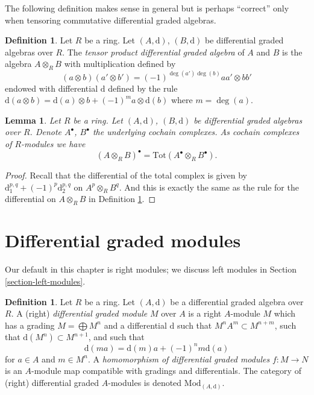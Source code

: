 \documentclass{stacks-project}
\theoremstyle{plain}
\newtheorem{lemma}[subsection]{Lemma}
\theoremstyle{definition}
\newtheorem{definition}[subsection]{Definition}
\theoremstyle{remark}
\numberwithin{equation}{subsection}
\begin{document}
\noindent
The following definition makes sense in general but is perhaps
``correct'' only when tensoring commutative differential graded
algebras.

\begin{definition}
\label{definition-tensor-product}
Let $R$ be a ring.
Let $(A, \text{d})$, $(B, \text{d})$ be differential graded algebras over $R$.
The {\it tensor product differential graded algebra} of $A$ and $B$
is the algebra $A \otimes_R B$ with multiplication defined by
$$
(a \otimes b)(a' \otimes b') = (-1)^{\deg(a')\deg(b)} aa' \otimes bb'
$$
endowed with differential $\text{d}$ defined by the rule
$\text{d}(a \otimes b) = \text{d}(a) \otimes b + (-1)^m a \otimes \text{d}(b)$
where $m = \deg(a)$.
\end{definition}

\begin{lemma}
\label{lemma-total-complex-tensor-product}
Let $R$ be a ring.
Let $(A, \text{d})$, $(B, \text{d})$ be differential graded algebras over $R$.
Denote $A^\bullet$, $B^\bullet$ the underlying cochain complexes.
As cochain complexes of $R$-modules we have
$$
(A \otimes_R B)^\bullet = \text{Tot}(A^\bullet \otimes_R B^\bullet).
$$
\end{lemma}

\begin{proof}
Recall that the differential of the total complex is given by
$\text{d}_1^{p, q} + (-1)^p \text{d}_2^{p, q}$ on $A^p \otimes_R B^q$.
And this is exactly the same as the rule for the differential
on $A \otimes_R B$ in
Definition \ref{definition-tensor-product}.
\end{proof}






\section{Differential graded modules}
\label{section-modules}

\noindent
Our default in this chapter is right modules;
we discuss left modules in Section \ref{section-left-modules}.

\begin{definition}
\label{definition-dgm}
Let $R$ be a ring.
Let $(A, \text{d})$ be a differential graded algebra over $R$.
A (right) {\it differential graded module} $M$ over $A$ is a right $A$-module
$M$ which has a grading $M = \bigoplus M^n$ and a differential $\text{d}$
such that $M^n A^m \subset M^{n + m}$, such that
$\text{d}(M^n) \subset M^{n + 1}$, and such that
$$
\text{d}(ma) = \text{d}(m)a + (-1)^n m\text{d}(a)
$$
for $a \in A$ and $m \in M^n$. A
{\it homomorphism of differential graded modules} $f : M \to N$
is an $A$-module map compatible with gradings and differentials.
The category of (right) differential graded $A$-modules is denoted
$\text{Mod}_{(A, \text{d})}$.
\end{definition}
\end{document}
